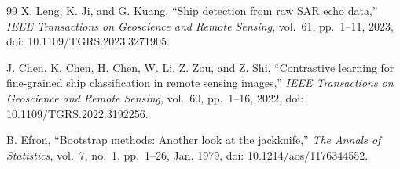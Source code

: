 \documentclass[journal]{IEEEtran}
\begin{document}
\begin{thebibliography}{99}
X. Leng, K. Ji, and G. Kuang, ``Ship detection from raw SAR echo data,'' \emph{IEEE Transactions on Geoscience and Remote Sensing}, vol.~61, pp.~1--11, 2023, doi: 10.1109/TGRS.2023.3271905.

J. Chen, K. Chen, H. Chen, W. Li, Z. Zou, and Z. Shi, ``Contrastive learning for fine-grained ship classification in remote sensing images,'' \emph{IEEE Transactions on Geoscience and Remote Sensing}, vol.~60, pp.~1--16, 2022, doi: 10.1109/TGRS.2022.3192256.

B. Efron, ``Bootstrap methods: Another look at the jackknife,'' \emph{The Annals of Statistics}, vol.~7, no.~1, pp.~1--26, Jan. 1979, doi: 10.1214/aos/1176344552.

\end{thebibliography}
\endgroup
\end{document}
